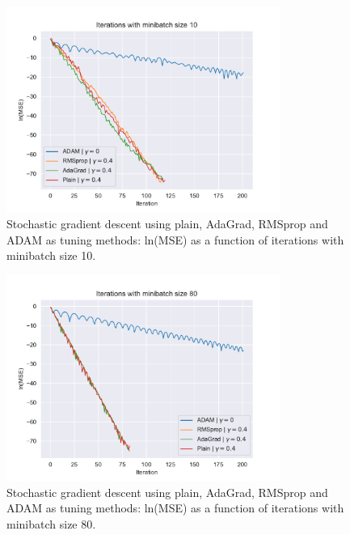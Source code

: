 \begin{figure}[H]
\centering
\includegraphics[width=0.8\textwidth]{Figures/PartA/minibatch_10_MSE(iter).pdf}
\caption{Stochastic gradient descent using plain, AdaGrad, RMSprop and ADAM as tuning methods: ln(MSE) as a function of iterations with minibatch size 10.}
\label{fig:minibatch_10_MSE-iter}
\end{figure}

\begin{figure}[H]
\centering
\includegraphics[width=0.8\textwidth]{Figures/PartA/minibatch_80_MSE(iter).pdf}
\caption{Stochastic gradient descent using plain, AdaGrad, RMSprop and ADAM as tuning methods: ln(MSE) as a function of iterations with minibatch size 80.}
\label{fig:minibatch_80_MSE-iter}
\end{figure}

